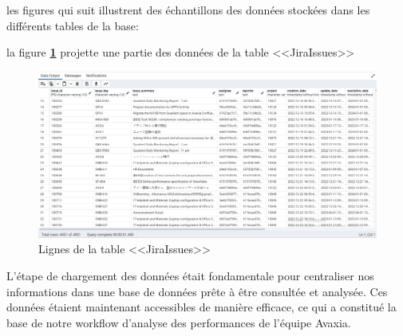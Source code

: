         \par les figures qui suit illustrent des échantillons des données stockées dans les différents tables de la base:
        \par la figure \textbf{\ref{fig:issue_table}} projette une partie des données de la table <<JiraIssues>>
        \begin{figure}[H]
            \centering
            \includegraphics[width=1\linewidth]{img//conception/issues.png}
            \caption{Lignes de la table <<JiraIssues>>}
            \label{fig:issue_table}
        \end{figure}
        
        \par L'étape de chargement des données était fondamentale pour centraliser nos informations dans une base de données prête à être consultée et analysée. Ces données étaient maintenant accessibles de manière efficace, ce qui a constitué la base de notre workflow d'analyse des performances de l'équipe Avaxia.
